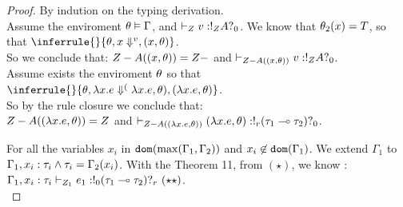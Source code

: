 \begin{proof}
  By indution on the typing derivation.\\


  Assume the enviroment $\theta \vDash \Gamma$,  and
  $\empty \tvdash{\nnatA  } \valr: \bang{\nnatA}\ltype \whynot{0}
  $. We know that $\theta_2(x) = T$,
  so that
  $\inferrule{ }{\env, x \bigstep \valr, (x, \env ) }  $. \\
  So we conclude that: $ Z- A(  (x, \theta)  ) = Z -  $ and
  $\empty \tvdash{ \nnatA- A(  (x, \env)  ) } \valr: \bang{\nnatA}\ltype\whynot{0}$.\\
   
  
 Assume exists the enviroment $\theta$ so that\\
  $\inferrule{ }{\env, \lambda x. \expr \bigstep (\lambda
    x.\expr,\env), (\lambda x.\expr, \env ) }  $. \\
  So by the rule closure we conclude that: \\
  $ Z- A(  (\lambda x.e,\theta)  ) = Z $ and
  $\empty \tvdash{ \nnatA- A(  (\lambda x.\expr, \env)  ) }   (\lambda
    x.\expr,\env) : \bang{r}  ( \type_1
      \lto \type_2)\whynot{0}$.\\

  


  

   For all the variables $x_i $ in $\mathtt{dom}(\max(\Gamma_1, \Gamma_2  )) $ and
   $x_i \not\in \mathtt{dom}(\Gamma_1)$. 
   We extend $\Gamma_1 $ to $\Gamma_1, x_i : \tau_i \land \tau_i =\Gamma_2(x_i) $. With the
   Theorem 11, from $(\star)$, we know :\\
   $\Gamma_1, x_i : \tau_i \vdash_{Z_1} e_1:  !_{0} ( \tau_1
   \multimap \tau_2  )?_{r}  ~(\star \star)   $.\\
   

\end{proof}

